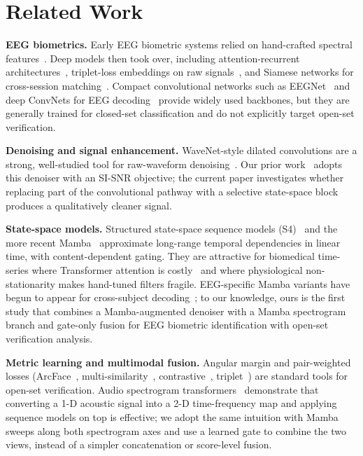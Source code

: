 \documentclass[conference,a4paper]{APSIPA2026}
\begin{document}
\section{Related Work}
\textbf{EEG biometrics.}
Early EEG biometric systems relied on hand-crafted spectral
features~\cite{fallahi2023brainnet}. Deep models then took
over, including attention-recurrent
architectures~\cite{zhang2017mindid}, triplet-loss embeddings on raw
signals~\cite{yang2022eeg}, and Siamese networks for cross-session
matching~\cite{fallahi2023brainnet}. Compact convolutional networks such
as EEGNet~\cite{lawhern2018eegnet} and deep ConvNets for EEG
decoding~\cite{schirrmeister2017deep} provide widely used backbones, but
they are generally trained for closed-set classification and do not
explicitly target open-set verification.

\textbf{Denoising and signal enhancement.}
WaveNet-style dilated convolutions are a strong, well-studied tool for
raw-waveform denoising~\cite{vandenoord2016wavenet,luo2019tasnet}. Our
prior work~\cite{vu2026aisei} adopts this denoiser with an SI-SNR
objective; the current paper investigates whether replacing part of the
convolutional pathway with a selective state-space block produces a
qualitatively cleaner signal.

\textbf{State-space models.}
Structured state-space sequence models (S4)~\cite{gu2022s4} and the more
recent Mamba~\cite{gu2023mamba} approximate long-range temporal
dependencies in linear time, with content-dependent gating. They are
attractive for biomedical time-series where Transformer attention is
costly~\cite{vaswani2017attention} and where physiological non-stationarity
makes hand-tuned filters fragile. EEG-specific Mamba variants have begun
to appear for cross-subject decoding~\cite{wang2024eegmamba}; to our
knowledge, ours is the first study that combines a Mamba-augmented
denoiser with a Mamba spectrogram branch and gate-only fusion for
EEG biometric identification with open-set verification analysis.

\textbf{Metric learning and multimodal fusion.}
Angular margin and pair-weighted losses (ArcFace~\cite{deng2019arcface},
multi-similarity~\cite{wang2019multisim}, contrastive~\cite{hadsell2006contrastive},
triplet~\cite{schroff2015facenet}) are standard tools for open-set
verification. Audio spectrogram transformers~\cite{gong2021ast}
demonstrate that converting a 1-D acoustic signal into a 2-D
time-frequency map and applying sequence models on top is effective; we
adopt the same intuition with Mamba sweeps along both spectrogram axes
and use a learned gate to combine the two views, instead
of a simpler concatenation or score-level fusion.
\end{document}
